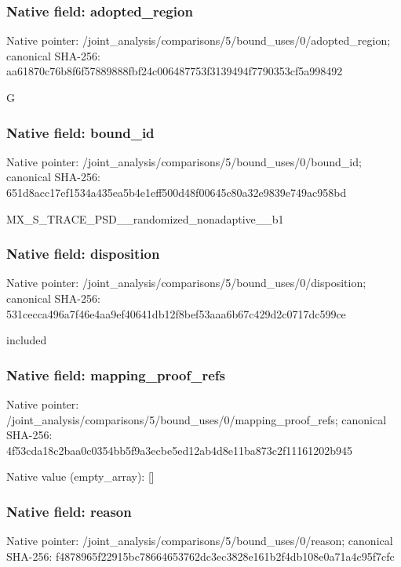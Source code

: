 \documentclass[10pt,a4paper]{article}
\begin{document}
\subsubsection{Native field: adopted\_\allowbreak{}region}
Native pointer: /joint\_\allowbreak{}analysis/comparisons/5/bound\_\allowbreak{}uses/0/adopted\_\allowbreak{}region; canonical SHA-256: aa61870c76b8f6f57889888fbf24c006487753f3139494f7790353cf5a998492

\begingroup\raggedright\sloppy G\par\endgroup

\subsubsection{Native field: bound\_\allowbreak{}id}
Native pointer: /joint\_\allowbreak{}analysis/comparisons/5/bound\_\allowbreak{}uses/0/bound\_\allowbreak{}id; canonical SHA-256: 651d8acc17ef1534a435ea5b4e1eff500d48f00645c80a32e9839e749ac958bd

\begingroup\raggedright\sloppy MX\_\allowbreak{}S\_\allowbreak{}TRACE\_\allowbreak{}PSD\_\allowbreak{}\_\allowbreak{}randomized\_\allowbreak{}nonadaptive\_\allowbreak{}\_\allowbreak{}b1\par\endgroup

\subsubsection{Native field: disposition}
Native pointer: /joint\_\allowbreak{}analysis/comparisons/5/bound\_\allowbreak{}uses/0/disposition; canonical SHA-256: 531cecca496a7f46e4aa9ef40641db12f8bef53aaa6b67c429d2c0717dc599ce

\begingroup\raggedright\sloppy included\par\endgroup

\subsubsection{Native field: mapping\_\allowbreak{}proof\_\allowbreak{}refs}
Native pointer: /joint\_\allowbreak{}analysis/comparisons/5/bound\_\allowbreak{}uses/0/mapping\_\allowbreak{}proof\_\allowbreak{}refs; canonical SHA-256: 4f53cda18c2baa0c0354bb5f9a3ecbe5ed12ab4d8e11ba873c2f11161202b945

Native value (empty\_\allowbreak{}array): []

\subsubsection{Native field: reason}
Native pointer: /joint\_\allowbreak{}analysis/comparisons/5/bound\_\allowbreak{}uses/0/reason; canonical SHA-256: f4878965f22915bc78664653762dc3ec3828e161b2f4db108e0a71a4c95f7cfc
\end{document}
